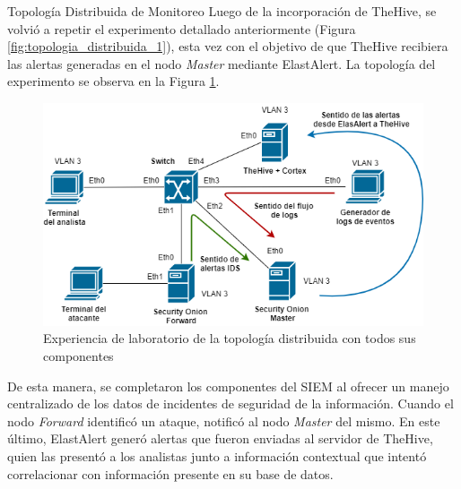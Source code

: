 \begin{subsection}{Topología Distribuida de Monitoreo}
    Luego de la incorporación de TheHive, se volvió a repetir el experimento detallado anteriormente (Figura \ref{fig:topologia_distribuida_1}), esta vez con el objetivo de que TheHive recibiera las alertas generadas en el nodo \textit{Master} mediante ElastAlert. La topología del experimento se observa en la Figura \ref{fig:topologia_distribuida_2}.\par
    \begin{figure}[H]
    \centering         \includegraphics[width=1\textwidth]{./iteracion_1_imagenes/figura_33_e_topologia_de_prueba_3.png}
    \caption{Experiencia de laboratorio de la topología distribuida con todos sus componentes}
    \label{fig:topologia_distribuida_2}
    \end{figure}
    \FloatBarrier
    De esta manera, se completaron los componentes del SIEM al ofrecer un manejo centralizado de los datos de incidentes de seguridad de la información. Cuando el nodo \textit{Forward} identificó un  ataque, notificó al nodo \textit{Master} del mismo. En este último, ElastAlert generó alertas que fueron enviadas al servidor de TheHive, quien las presentó a los analistas junto a información contextual que intentó correlacionar con información presente en su base de datos.\par
    

\end{subsection}
